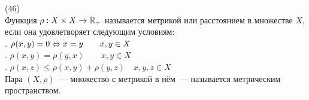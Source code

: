 (46)\\
Функция $\rho: X \times X \to \mathbb{R}_+$ называется метрикой или расстоянием в множестве $X$, если она удовлетворяет следующим условиям:\\
. $\rho(x, y) = 0 \Leftrightarrow x = y \qquad x, y \in X$\\
. $\rho(x, y) = \rho(y, x) \qquad x, y \in X$\\
. $\rho(x, z) \le \rho(x, y) + \rho(y, z) \quad x, y, z \in X$\\
Пара $(X, \rho)$~--- множество с метрикой в нём~--- называется  метрическим пространством.